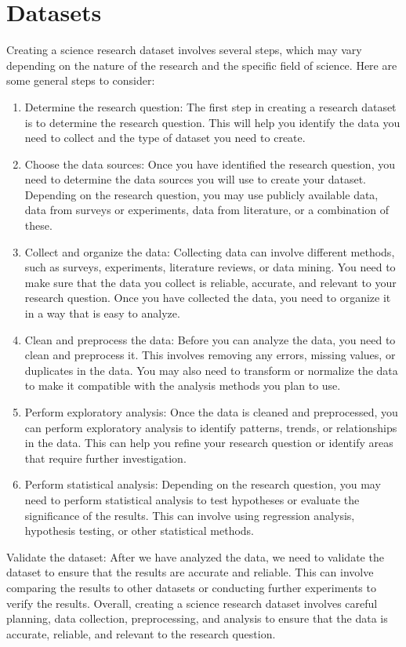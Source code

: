 \section{Datasets} \label{subsec:datasets}
Creating a science research dataset involves several steps, which may vary depending on the nature of the research and the specific field of science.
Here are some general steps to consider:
\begin{enumerate}
    \item Determine the research question: The first step in creating a research dataset is to determine the research question. This will help you
    identify the data you need to collect and the type of dataset you need to create.
    \item Choose the data sources: Once you have identified the research question, you need to determine the data sources you will use to create your dataset.
    Depending on the research question, you may use publicly available data, data from surveys or experiments, data from literature, or a combination of these.
    \item Collect and organize the data: Collecting data can involve different methods, such as surveys, experiments, literature reviews, or data mining.
    You need to make sure that the data you collect is reliable, accurate, and relevant to your research question. Once you have collected the data,
    you need to organize it in a way that is easy to analyze.
    \item Clean and preprocess the data: Before you can analyze the data, you need to clean and preprocess it. This involves removing any errors,
    missing values, or duplicates in the data. You may also need to transform or normalize the data to make it compatible with the analysis
    methods you plan to use.
    \item Perform exploratory analysis: Once the data is cleaned and preprocessed, you can perform exploratory analysis to identify patterns,
    trends, or relationships in the data. This can help you refine your research question or identify areas that require further investigation.
    \item Perform statistical analysis: Depending on the research question, you may need to perform statistical analysis to test
    hypotheses or evaluate the significance of the results. This can involve using regression analysis, hypothesis testing, or other statistical methods.
\end{enumerate}
Validate the dataset: After we have analyzed the data, we need to validate the dataset to ensure that the results are accurate and reliable.
This can involve comparing the results to other datasets or conducting further experiments to verify the results.
Overall, creating a science research dataset involves careful planning, data collection, preprocessing, and analysis to ensure that the data is accurate,
reliable, and relevant to the research question.
